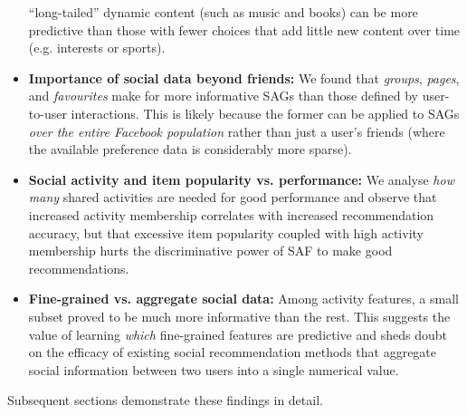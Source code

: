 \begin{itemize}
``long-tailed'' dynamic content (such as music and books) can be more
predictive than those with fewer choices that add little new content
over time (e.g. interests or sports).
\item {\bf Importance of social data beyond friends:} 
We found that \emph{groups}, \emph{pages}, and \emph{favourites} 
make for more informative SAGs than those defined by user-to-user
interactions.  This is likely because the former can be applied to
SAGs \emph{over the entire Facebook population} rather than just a
user's friends (where the available preference data is considerably
more sparse).
\item {\bf Social activity and item popularity vs. performance:} 
We analyse \emph{how many} shared activities are needed for
good performance and observe that increased activity membership correlates
with increased recommendation accuracy, but that excessive item popularity
coupled with high activity membership hurts the discriminative power
of SAF to make good recommendations.
\item {\bf Fine-grained vs. aggregate social data:}
Among activity features, a small subset proved to be much more informative
than the rest.  This suggests the value of
learning \emph{which} fine-grained features are predictive and sheds
doubt on the efficacy of existing social recommendation methods that
aggregate social information between two users into a single numerical
value.
\end{itemize}
Subsequent sections demonstrate these findings in detail.




